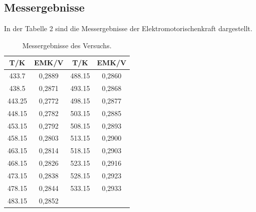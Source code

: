 \documentclass[12pt,a4paper,titlepage,headinclude,bibtotoc]{scrartcl}
\begin{document}
\subsection{Messergebnisse}
In der Tabelle 2 sind die Messergebnisse der Elektromotorischenkraft dargestellt.
\begin{table}[h!]
\centering
\caption{Messergebnisse des Versuchs.}
\begin{tabular}{c|c||c|c}
T/\;K & EMK/\;V &T/\;K & EMK/\;V\\ 
\hline
433.7 & 0,2889 &   488.15 &0,2860\\ 
438.5 & 0,2871 & 493.15&0,2868 \\
443.25 & 0,2772 &  498.15&0,2877\\
448.15 & 0,2782 & 503.15& 0,2885\\
453.15 &0,2792 & 508.15 &0,2893\\
458.15 & 0,2803 & 513.15 &0,2900\\
463.15 &0,2814 & 518.15 &0,2903\\
468.15 &0,2826 & 523.15&0,2916\\
473.15 &0,2838 & 528.15 & 0,2923\\
478.15 & 0,2844 & 533.15& 0,2933\\
483.15 & 0,2852 &&\\
\end{tabular} 
\end{table}
\FloatBarrier
\end{document}

